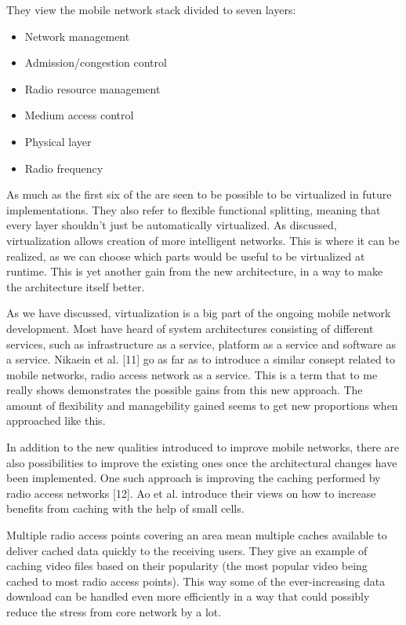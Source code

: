 \documentclass[conference]{IEEEtran}
\begin{document}
\par
They view the mobile network stack divided to seven layers:
\begin{itemize}
\item Network management
\item Admission/congestion control
\item Radio resource management
\item Medium access control
\item Physical layer
\item Radio frequency
\end{itemize}
As much as the first six of the are seen to be possible to be virtualized in future implementations. They also refer to flexible functional splitting, meaning that every layer shouldn't just be automatically virtualized. As discussed, virtualization allows creation of more intelligent networks. This is where it can be realized, as we can choose which parts would be useful to be virtualized at runtime. This is yet another gain from the new architecture, in a way to make the architecture itself better.
\par
As we have discussed, virtualization is a big part of the ongoing mobile network development. Most have heard of system architectures consisting of different services, such as infrastructure as a service, platform as a service and software as a service. Nikaein et al. [11] go as far as to introduce a similar consept related to mobile networks, radio access network as a service. This is a term that to me really shows demonstrates the possible gains from this new approach. The amount of flexibility and managebility gained seems to get new proportions when approached like this.
\par
In addition to the new qualities introduced to improve mobile networks, there are also possibilities to improve the existing ones once the architectural changes have been implemented. One such approach is improving the caching performed by radio access networks [12]. Ao et al. introduce their views on how to increase benefits from caching with the help of small cells.
\par
Multiple radio access points covering an area mean multiple caches available to deliver cached data quickly to the receiving users. They give an example of caching video files based on their popularity (the most popular video being cached to most radio access points). This way some of the ever-increasing data download can be handled even more efficiently in a way that could possibly reduce the stress from core network by a lot.
\end{document}
